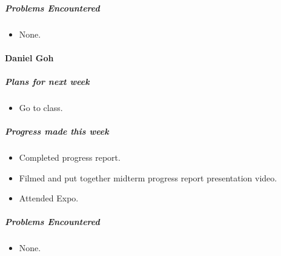 {\subparagraph{Problems Encountered}
\begin{itemize}
  \item None.
\end{itemize}

\vspace{3mm}
\paragraph{Daniel Goh}
\subparagraph{Plans for next week}
\begin{itemize}
  \item Go to class.
\end{itemize}

\subparagraph{Progress made this week}
\begin{itemize}
  \item Completed progress report.
  \item Filmed and put together midterm progress report presentation video.
  \item Attended Expo.
\end{itemize}

\subparagraph{Problems Encountered}
\begin{itemize}
  \item None.
\end{itemize}

}

\newpage

